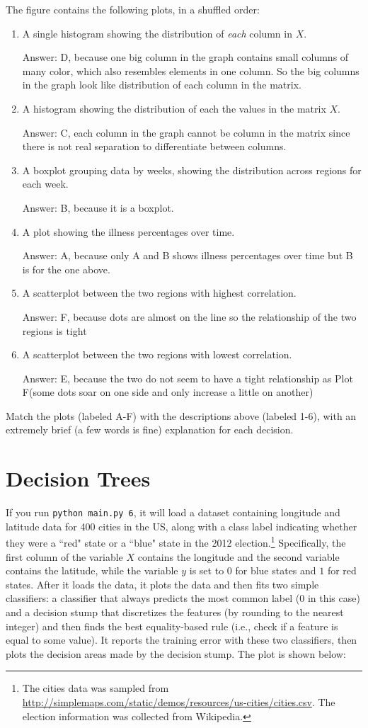 \documentclass{article}
\def\ans#1{\par\gre{Answer: #1}}
\def\blu#1{{\color{blu}#1}}
\def\gre#1{{\color{gre}#1}}
\begin{document}
  The figure contains the following plots, in a shuffled order:
  \begin{enumerate}
  \item A single histogram showing the distribution of \emph{each} column in $X$.
  \ans{D, because one big column in the graph contains small columns of many color, which also resembles elements in one column. So the big columns in the graph look like distribution of each column in the matrix.}
  \item A histogram showing the distribution of each the values in the matrix $X$.
  \ans{C, each column in the graph cannot be column in the matrix since there is not real separation to differentiate between columns.}
  \item A boxplot grouping data by weeks, showing the distribution across regions for each week.
  \ans{B, because it is a boxplot.}
  \item A plot showing the illness percentages over time.
  \ans{A, because only A and B shows illness percentages over time but B is for the one above.}
  \item A scatterplot between the two regions with highest correlation.
  \ans{F, because dots are almost on the line so the relationship of the two regions is tight}
  \item A scatterplot between the two regions with lowest correlation.
  \ans{E, because the two do not seem to have a tight relationship as Plot F(some dots soar on one side and only increase a little on another)}
  \end{enumerate}

  \blu{Match the plots (labeled A-F) with the descriptions above (labeled 1-6), with an extremely brief (a few words is fine) explanation for each decision.}

  \clearpage
  
  \section{Decision Trees}

  If you run \texttt{python main.py 6}, it will load a dataset containing longitude
  and latitude data for 400 cities in the US, along with a class label indicating
  whether they were a ``red" state or a ``blue" state in the 2012
  election.\footnote{The cities data was sampled from \url{http://simplemaps.com/static/demos/resources/us-cities/cities.csv}. The election information was collected from Wikipedia.}
  Specifically, the first column of the variable $X$ contains the
  longitude and the second variable contains the latitude,
  while the variable $y$ is set to $0$ for blue states and $1$ for red states.
  After it loads the data, it plots the data and then fits two simple
  classifiers: a classifier that always predicts the
  most common label ($0$ in this case) and a decision stump
  that discretizes the features (by rounding to the nearest integer)
  and then finds the best equality-based rule (i.e., check
  if a feature is equal to some value).
  It reports the training error with these two classifiers, then plots the decision areas made by the decision stump.
  The plot is shown below:
\end{document}

